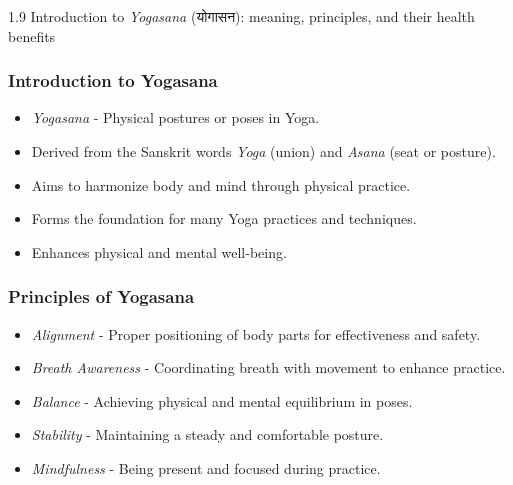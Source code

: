 \begin{frame}[fragile]\frametitle{}
\begin{center}
{\Large 1.9 Introduction to \textit{Yogasana} (योगासन): meaning, principles, and their health benefits}
\end{center}
\end{frame}


\begin{frame}[fragile]\frametitle{Introduction to Yogasana}

      \begin{itemize}
		\item \textit{Yogasana} - Physical postures or poses in Yoga.
		\item Derived from the Sanskrit words \textit{Yoga} (union) and \textit{Asana} (seat or posture).
		\item Aims to harmonize body and mind through physical practice.
		\item Forms the foundation for many Yoga practices and techniques.
		\item Enhances physical and mental well-being.
	  \end{itemize}

\end{frame}

\begin{frame}[fragile]\frametitle{Principles of Yogasana}

      \begin{itemize}
		\item \textit{Alignment} - Proper positioning of body parts for effectiveness and safety.
		\item \textit{Breath Awareness} - Coordinating breath with movement to enhance practice.
		\item \textit{Balance} - Achieving physical and mental equilibrium in poses.
		\item \textit{Stability} - Maintaining a steady and comfortable posture.
		\item \textit{Mindfulness} - Being present and focused during practice.
	  \end{itemize}

\end{frame}

